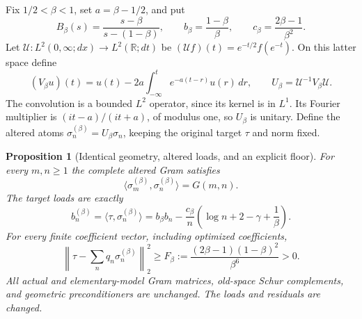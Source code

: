 \documentclass[11pt]{article}
\newtheorem{proposition}[theorem]{Proposition}
\theoremstyle{remark}
\begin{document}
Fix $1/2<\beta<1$, set $a=\beta-1/2$, and put
\[
 B_\beta(s)=\frac{s-\beta}{s-(1-\beta)},\qquad
 b_\beta=\frac{1-\beta}{\beta},\qquad
 c_\beta=\frac{2\beta-1}{\beta^2}.
\]
Let $\mathcal U:L^2(0,\infty;dx)\to L^2(\mathbb R;dt)$ be
$(\mathcal Uf)(t)=e^{-t/2}f(e^{-t})$. On this latter space define
\[
 (V_\beta u)(t)=u(t)-2a\int_{-\infty}^t
                                      e^{-a(t-r)}u(r)\,dr,
 \qquad U_\beta=\mathcal U^{-1}V_\beta\mathcal U.
\]
The convolution is a bounded $L^2$ operator, since its kernel is in
$L^1$. Its Fourier multiplier is $(it-a)/(it+a)$, of modulus one,
so $U_\beta$ is unitary. Define the altered atoms
$\sigma_n^{(\beta)}=U_\beta\sigma_n$, keeping the original target
$\tau$ and norm fixed.

\begin{proposition}[Identical geometry, altered loads, and an explicit floor]
\label{prop:ns74-same-gram}
For every $m,n\geq1$ the complete altered Gram satisfies
\[
 \langle\sigma_m^{(\beta)},\sigma_n^{(\beta)}\rangle=G(m,n).
\]
The target loads are exactly
\begin{equation}
 b_n^{(\beta)}=\langle\tau,\sigma_n^{(\beta)}\rangle
 =b_\beta b_n-\frac{c_\beta}{n}
                    \left(\log n+2-\gamma+\frac1\beta\right).
 \label{eq:ns74-loads}
\end{equation}
For every finite coefficient vector, including optimized coefficients,
\begin{equation}
 \left\|\tau-\sum_n q_n\sigma_n^{(\beta)}\right\|_2^2
 \geq F_\beta:=\frac{(2\beta-1)(1-\beta)^2}{\beta^6}>0.
 \label{eq:ns74-floor}
\end{equation}
All actual and elementary-model Gram matrices, old-space Schur
complements, and geometric preconditioners are unchanged. The loads
and residuals are changed.
\end{proposition}
\end{document}
